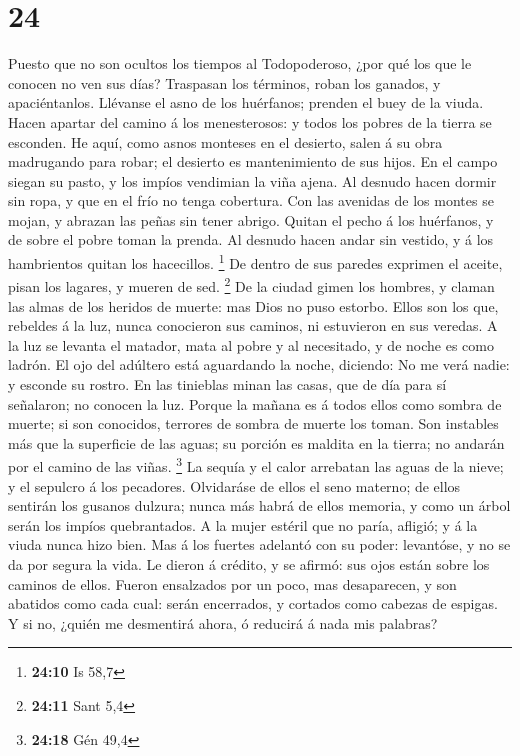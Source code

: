 \hypertarget{section-23}{%
\section{24}\label{section-23}}

 Puesto que no son ocultos los tiempos al Todopoderoso, ¿por
qué los que le conocen no ven sus días?  Traspasan los
términos, roban los ganados, y apaciéntanlos.  Llévanse el
asno de los huérfanos; prenden el buey de la viuda.  Hacen
apartar del camino á los menesterosos: y todos los pobres de la tierra
se esconden.  He aquí, como asnos monteses en el desierto,
salen á su obra madrugando para robar; el desierto es mantenimiento de
sus hijos.  En el campo siegan su pasto, y los impíos
vendimian la viña ajena.  Al desnudo hacen dormir sin ropa,
y que en el frío no tenga cobertura.  Con las avenidas de
los montes se mojan, y abrazan las peñas sin tener abrigo. 
Quitan el pecho á los huérfanos, y de sobre el pobre toman la prenda.
 Al desnudo hacen andar sin vestido, y á los hambrientos
quitan los hacecillos. \footnote{\textbf{24:10} Is 58,7} 
De dentro de sus paredes exprimen el aceite, pisan los lagares, y mueren
de sed. \footnote{\textbf{24:11} Sant 5,4}  De la ciudad
gimen los hombres, y claman las almas de los heridos de muerte: mas Dios
no puso estorbo.  Ellos son los que, rebeldes á la luz,
nunca conocieron sus caminos, ni estuvieron en sus veredas.
 A la luz se levanta el matador, mata al pobre y al
necesitado, y de noche es como ladrón.  El ojo del adúltero
está aguardando la noche, diciendo: No me verá nadie: y esconde su
rostro.  En las tinieblas minan las casas, que de día para
sí señalaron; no conocen la luz.  Porque la mañana es á
todos ellos como sombra de muerte; si son conocidos, terrores de sombra
de muerte los toman.  Son instables más que la superficie
de las aguas; su porción es maldita en la tierra; no andarán por el
camino de las viñas. \footnote{\textbf{24:18} Gén 49,4}  La
sequía y el calor arrebatan las aguas de la nieve; y el sepulcro á los
pecadores.  Olvidaráse de ellos el seno materno; de ellos
sentirán los gusanos dulzura; nunca más habrá de ellos memoria, y como
un árbol serán los impíos quebrantados.  A la mujer estéril
que no paría, afligió; y á la viuda nunca hizo bien.  Mas á
los fuertes adelantó con su poder: levantóse, y no se da por segura la
vida.  Le dieron á crédito, y se afirmó: sus ojos están
sobre los caminos de ellos.  Fueron ensalzados por un poco,
mas desaparecen, y son abatidos como cada cual: serán encerrados, y
cortados como cabezas de espigas.  Y si no, ¿quién me
desmentirá ahora, ó reducirá á nada mis palabras?

